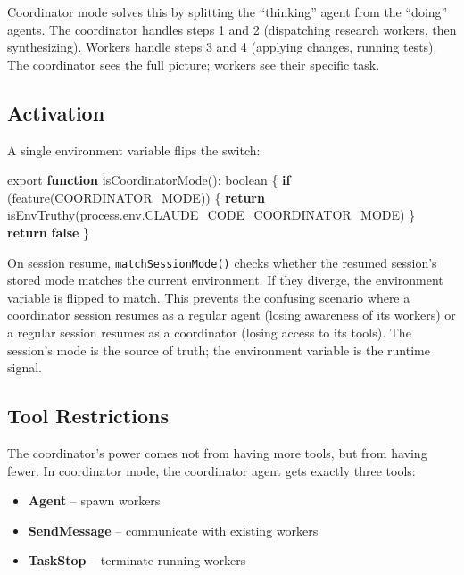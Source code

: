 \documentclass[
  english,
  11pt,
  letterpaper,
]{book}
\newenvironment{Shaded}{\begin{snugshade}}{\end{snugshade}}
\newcommand{\AttributeTok}[1]{\textcolor[rgb]{0.40,0.45,0.13}{#1}}
\newcommand{\BuiltInTok}[1]{\textcolor[rgb]{0.00,0.23,0.31}{#1}}
\newcommand{\ControlFlowTok}[1]{\textcolor[rgb]{0.00,0.23,0.31}{\textbf{#1}}}
\newcommand{\DataTypeTok}[1]{\textcolor[rgb]{0.68,0.00,0.00}{#1}}
\newcommand{\FunctionTok}[1]{\textcolor[rgb]{0.28,0.35,0.67}{#1}}
\newcommand{\ImportTok}[1]{\textcolor[rgb]{0.00,0.46,0.62}{#1}}
\newcommand{\KeywordTok}[1]{\textcolor[rgb]{0.00,0.23,0.31}{\textbf{#1}}}
\newcommand{\NormalTok}[1]{\textcolor[rgb]{0.00,0.23,0.31}{#1}}
\newcommand{\OperatorTok}[1]{\textcolor[rgb]{0.37,0.37,0.37}{#1}}
\newcommand{\StringTok}[1]{\textcolor[rgb]{0.13,0.47,0.30}{#1}}
\providecommand{\tightlist}{%
  \setlength{\itemsep}{0pt}\setlength{\parskip}{0pt}}
\begin{document}
Coordinator mode solves this by splitting the ``thinking'' agent from
the ``doing'' agents. The coordinator handles steps 1 and 2 (dispatching
research workers, then synthesizing). Workers handle steps 3 and 4
(applying changes, running tests). The coordinator sees the full
picture; workers see their specific task.

\subsection{Activation}\label{activation}

A single environment variable flips the switch:

\begin{Shaded}
\begin{Highlighting}[]
\ImportTok{export} \KeywordTok{function} \FunctionTok{isCoordinatorMode}\NormalTok{()}\OperatorTok{:} \DataTypeTok{boolean}\NormalTok{ \{}
  \ControlFlowTok{if}\NormalTok{ (}\FunctionTok{feature}\NormalTok{(}\StringTok{\textquotesingle{}COORDINATOR\_MODE\textquotesingle{}}\NormalTok{)) \{}
    \ControlFlowTok{return} \FunctionTok{isEnvTruthy}\NormalTok{(}\BuiltInTok{process}\OperatorTok{.}\AttributeTok{env}\OperatorTok{.}\AttributeTok{CLAUDE\_CODE\_COORDINATOR\_MODE}\NormalTok{)}
\NormalTok{  \}}
  \ControlFlowTok{return} \KeywordTok{false}
\NormalTok{\}}
\end{Highlighting}
\end{Shaded}

On session resume, \texttt{matchSessionMode()} checks whether the
resumed session's stored mode matches the current environment. If they
diverge, the environment variable is flipped to match. This prevents the
confusing scenario where a coordinator session resumes as a regular
agent (losing awareness of its workers) or a regular session resumes as
a coordinator (losing access to its tools). The session's mode is the
source of truth; the environment variable is the runtime signal.

\subsection{Tool Restrictions}\label{tool-restrictions}

The coordinator's power comes not from having more tools, but from
having fewer. In coordinator mode, the coordinator agent gets exactly
three tools:

\begin{itemize}
\tightlist
\item
  \textbf{Agent} -- spawn workers
\item
  \textbf{SendMessage} -- communicate with existing workers
\item
  \textbf{TaskStop} -- terminate running workers
\end{itemize}
\end{document}
